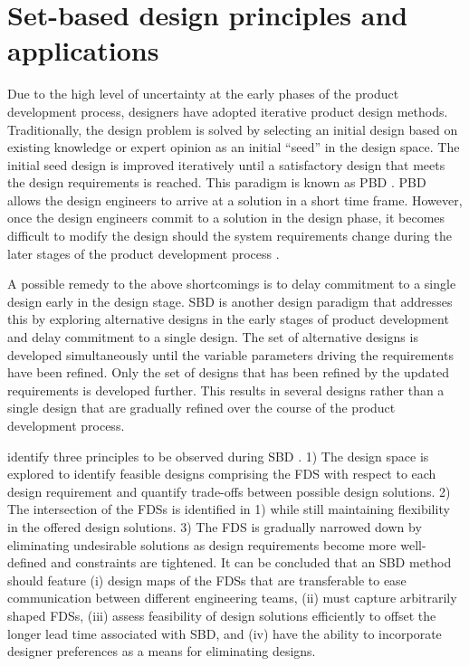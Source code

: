 \section{Set-based design principles and applications} 
\label{sec:SBD}

Due to the high level of uncertainty at the early phases of the product development process, designers have adopted iterative product design methods. Traditionally, the design problem is solved by selecting an initial design based on existing knowledge or expert opinion as an initial ``seed'' in the design space. The initial seed design is improved iteratively until a satisfactory design that meets the design requirements is reached. This paradigm is known as \ac{PBD} \cite{Qureshi2014, Kerga2014, SobekIi1999}. \ac{PBD} allows the design engineers to arrive at a solution in a short time frame. However, once the design engineers commit to a solution in the design phase, it becomes difficult to modify the design should the system requirements change during the later stages of the product development process \cite{Levandowski2014a, Carlson2000a}.

A possible remedy to the above shortcomings is to delay commitment to a single design early in the design stage. \Acf{SBD} is another design paradigm that addresses this by exploring alternative designs in the early stages of product development and delay commitment to a single design. The set of alternative designs is developed simultaneously until the variable parameters driving the requirements have been refined. Only the set of designs that has been refined by the updated requirements is developed further. This results in several designs rather than a single design that are gradually refined over the course of the product development process.

\citeauthor{SobekIi1999} identify three principles to be observed during \ac{SBD} \cite{SobekIi1999}. 1) The design space is explored to identify feasible designs comprising the \ac{FDS} with respect to each design requirement and quantify trade-offs between possible design solutions. 2) The intersection of the \acp{FDS} is identified in 1) while still maintaining flexibility in the offered design solutions. 3) The \ac{FDS} is gradually narrowed down by eliminating undesirable solutions as design requirements become more well-defined and constraints are tightened. It can be concluded that an \ac{SBD} method should feature (i) design maps of the \acp{FDS} that are transferable to ease communication between different engineering teams, (ii) must capture arbitrarily shaped \acp{FDS}, (iii) assess feasibility of design solutions efficiently to offset the longer lead time associated with \ac{SBD}, and (iv) have the ability to incorporate designer preferences as a means for eliminating designs.

